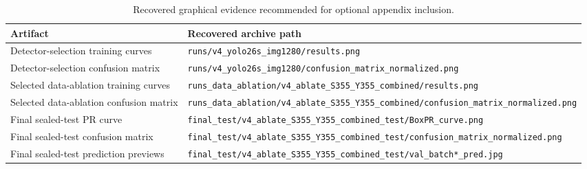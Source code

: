 \begin{table}[H]
\centering
\small
\begin{tabularx}{\textwidth}{p{} X}
\toprule
\textbf{Artifact} & \textbf{Recovered archive path} \\
\midrule
Detector-selection training curves & \texttt{runs/v4\_yolo26s\_img1280/results.png} \\
Detector-selection confusion matrix & \texttt{runs/v4\_yolo26s\_img1280/confusion\_matrix\_normalized.png} \\
Selected data-ablation training curves & \texttt{runs\_data\_ablation/v4\_ablate\_S355\_Y355\_combined/results.png} \\
Selected data-ablation confusion matrix & \texttt{runs\_data\_ablation/v4\_ablate\_S355\_Y355\_combined/confusion\_matrix\_normalized.png} \\
Final sealed-test PR curve & \texttt{final\_test/v4\_ablate\_S355\_Y355\_combined\_test/BoxPR\_curve.png} \\
Final sealed-test confusion matrix & \texttt{final\_test/v4\_ablate\_S355\_Y355\_combined\_test/confusion\_matrix\_normalized.png} \\
Final sealed-test prediction previews & \texttt{final\_test/v4\_ablate\_S355\_Y355\_combined\_test/val\_batch*\_pred.jpg} \\
\bottomrule
\end{tabularx}
\caption{Recovered graphical evidence recommended for optional appendix inclusion.}
\label{tab:appendix_uavape_graphical_evidence}
\end{table}
